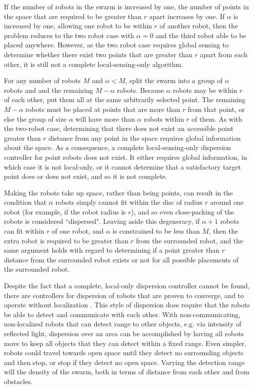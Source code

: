 If the number of robots in the swarm is increased by one, the number of points in the space that are required to be greater than $r$ apart increases by one. 
If $\alpha$ is increased by one, allowing one robot to be within $r$ of another robot, then the problem reduces to the two robot case with $\alpha=0$ and the third robot able to be placed anywhere. 
However, as the two robot case requires global sensing to determine whether there exist two points that are greater than $r$ apart from each other, it is still not a complete local-sensing-only algorithm. 

For any number of robots $M$ and $\alpha < M$, split the swarm into a group of $\alpha$ robots and and the remaining $M - \alpha$ robots. 
Because $\alpha$ robots may be within $r$ of each other, put them all at the same arbitrarily selected point. 
The remaining $M - \alpha$ robots must be placed at points that are more than $r$ from that point, or else the group of size $\alpha$ will have more than $\alpha$ robots within $r$ of them.
As with the two-robot case, determining that there does not exist an accessible point greater than $r$ distance from any point in the space requires global information about the space. 
As a consequence, a complete local-sensing-only dispersion controller for point robots does not exist.
It either requires global information, in which case it is not local-only, or it cannot determine that a satisfactory target point does or does not exist, and so it is not complete.

Making the robots take up space, rather than being points, can result in the condition that $\alpha$ robots simply cannot fit within the disc of radius $r$ around one robot (for example, if the robot radius is $r$), and so even close-packing of the robots is considered ``dispersed".
Leaving aside this degeneracy, if $\alpha + 1$ robots can fit within $r$ of one robot, and $\alpha$ is constrained to be less than $M$, then the extra robot is required to be greater than $r$ from the surrounded robot, and the same argument holds with regard to determining if a point greater than $r$ distance from the surrounded robot exists or not for all possible placements of the surrounded robot.

Despite the fact that a complete, local-only dispersion controller cannot be found, there are controllers for dispersion of robots that are proven to converge, and to operate without localization \cite{correll2009ad}. 
This style of dispersion does require that the robots be able to detect and communicate with each other.
With non-communicating, non-localized robots that can detect range to other objects, e.g. via intensity of reflected light, dispersion over an area can be accomplished by having all robots move to keep all objects that they can detect within a fixed range.
Even simpler, robots could travel towards open space until they detect no surrounding objects and then stop, or stop if they detect no open space.  
Varying the detection range will the density of the swarm, both in terms of distance from each other and from obstacles. 


